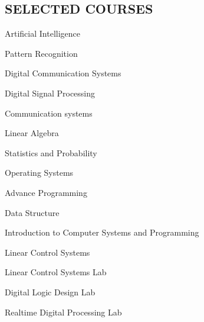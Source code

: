 \documentclass[11pt,a4paper,roman]{moderncv}        %
\begin{document}
\subsection{SELECTED COURSES}
	\begin{itemize*}
		\item Artificial Intelligence
		\item Pattern Recognition
		\item Digital Communication Systems
		\item Digital Signal Processing
		\item Communication systems 
		\item Linear Algebra
		\item Statistics and Probability
		\item Operating Systems
		\item Advance Programming
		\item Data Structure
		\item Introduction to Computer Systems and Programming
		\item Linear Control Systems
		\item Linear Control Systems Lab
		\item Digital Logic Design Lab
		\item Realtime Digital Processing Lab
	\end{itemize*}
\end{document}
